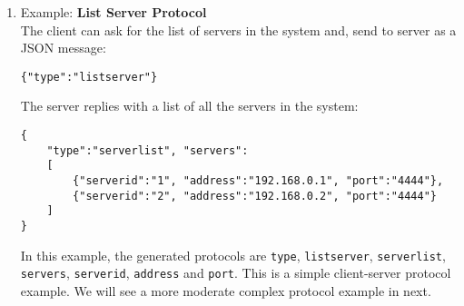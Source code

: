 \documentclass[dareport.tex]{subfiles}
\begin{document}
\begin{enumerate}[leftmargin=*]

\item Example: \textbf{List Server Protocol}
\\
The client can ask for the list of servers in the system and, send to server as a JSON message:
\begin{small}
\begin{verbatim}
{"type":"listserver"}
\end{verbatim}
\end{small}

The server replies with a list of all the servers in the system:
\begin{small}
\begin{verbatim}
{
    "type":"serverlist", "servers": 
    [ 
        {"serverid":"1", "address":"192.168.0.1", "port":"4444"}, 
        {"serverid":"2", "address":"192.168.0.2", "port":"4444"}
    ]
}
\end{verbatim}
\end{small}
In this example, the generated protocols are \verb|type|, \verb|listserver|, \verb|serverlist|, \verb|servers|, \verb|serverid|, \verb|address| and \verb|port|. This is a simple client-server protocol example. We will see a more moderate complex protocol example in next.


\end{enumerate}
\end{document}
